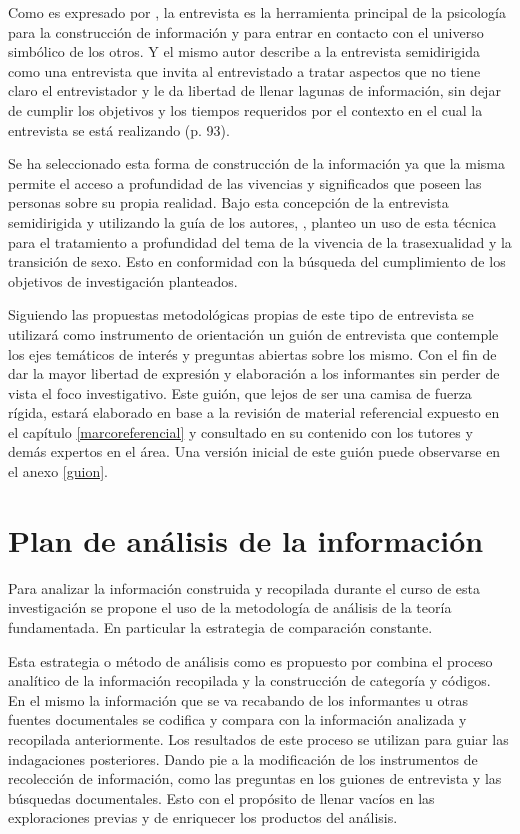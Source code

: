 Como es expresado por \textcite{Colin1999}, la entrevista es la herramienta
principal de la psicología para la construcción de información y para entrar en
contacto con el universo simbólico de los otros. Y el mismo autor describe a la
entrevista semidirigida como una entrevista que invita al entrevistado a tratar
aspectos que no tiene claro el entrevistador y le da libertad de llenar lagunas
de información, sin dejar de cumplir los objetivos y los tiempos requeridos por
el contexto en el cual la entrevista se está realizando (p. 93).

Se ha seleccionado esta forma de construcción de la información ya que la misma
permite el acceso a profundidad de las vivencias y significados que poseen las
personas sobre su propia realidad. Bajo esta concepción de la entrevista
semidirigida y utilizando la guía de los autores,
\textcites{Colin1999}{Hidalgo2005}{Perpina2014}, planteo un uso de esta técnica
para el tratamiento a profundidad del tema de la vivencia de la trasexualidad y
la transición de sexo. Esto en conformidad con la búsqueda del cumplimiento de
los objetivos de investigación planteados.

Siguiendo las propuestas metodológicas propias de este tipo de entrevista se
utilizará como instrumento de orientación un guión de entrevista que contemple
los ejes temáticos de interés y preguntas abiertas sobre los mismo. Con el fin
de dar la mayor libertad de expresión y elaboración a los informantes sin perder
de vista el foco investigativo. Este guión, que lejos de ser una camisa de
fuerza rígida, estará elaborado en base a la revisión de material referencial
expuesto en el capítulo \ref{marcoreferencial} y consultado en su contenido con
los tutores y demás expertos en el área. Una versión inicial de este guión puede observarse en el anexo \ref{guion}.

\section{Plan de análisis de la información}

	Para analizar la información construida y recopilada durante el curso de esta
investigación se propone el uso de la metodología de análisis de la teoría
fundamentada. En particular la estrategia de comparación constante.

	Esta estrategia o método de análisis como es propuesto por \textcite[][p.
102]{Glaser86} combina el proceso analítico de la información recopilada y la
construcción de categoría y códigos. En el mismo la información que se va
recabando de los informantes u otras fuentes documentales se codifica y compara
con la información analizada y recopilada anteriormente. Los resultados de este
proceso se utilizan para guiar las indagaciones posteriores. Dando pie a la
modificación de los instrumentos de recolección de información, como las
preguntas en los guiones de entrevista y las búsquedas documentales. Esto con el
propósito de llenar vacíos en las exploraciones previas y de enriquecer los
productos del análisis.
	
